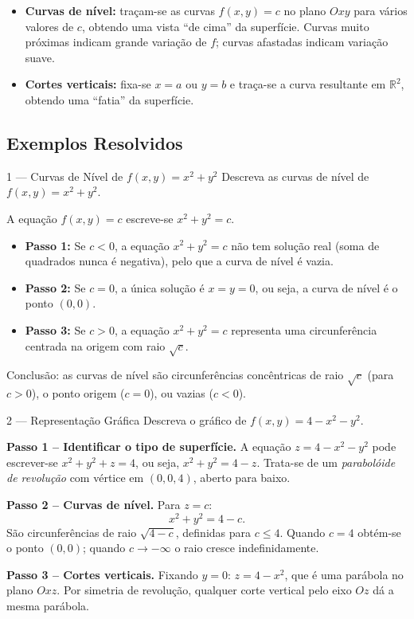\begin{itemize}
  \item \textbf{Curvas de nível:} traçam-se as curvas $f(x,y)=c$ no plano
        $Oxy$ para vários valores de $c$, obtendo uma vista ``de cima'' da
        superfície. Curvas muito próximas indicam grande variação de $f$;
        curvas afastadas indicam variação suave.
  \item \textbf{Cortes verticais:} fixa-se $x=a$ ou $y=b$ e traça-se a
        curva resultante em $\mathbb{R}^2$, obtendo uma ``fatia'' da superfície.
\end{itemize}

\subsection{Exemplos Resolvidos}

\begin{exbox}{1 --- Curvas de Nível de $f(x,y)=x^2+y^2$}
  Descreva as curvas de nível de $f(x,y)=x^2+y^2$.
\end{exbox}
\begin{solbox}
  A equação $f(x,y)=c$ escreve-se $x^2+y^2=c$.
  \begin{itemize}
    \item \textbf{Passo 1:} Se $c<0$, a equação $x^2+y^2=c$ não tem solução
          real (soma de quadrados nunca é negativa), pelo que a curva de nível
          é vazia.
    \item \textbf{Passo 2:} Se $c=0$, a única solução é $x=y=0$, ou seja,
          a curva de nível é o ponto $(0,0)$.
    \item \textbf{Passo 3:} Se $c>0$, a equação $x^2+y^2=c$ representa
          uma circunferência centrada na origem com raio $\sqrt{c}$.
  \end{itemize}
  Conclusão: as curvas de nível são circunferências concêntricas de raio
  $\sqrt{c}$ (para $c>0$), o ponto origem ($c=0$), ou vazias ($c<0$).
\end{solbox}

\begin{exbox}{2 --- Representação Gráfica}
  Descreva o gráfico de $f(x,y)=4-x^2-y^2$.
\end{exbox}
\begin{solbox}
  \textbf{Passo 1 -- Identificar o tipo de superfície.} A equação
  $z=4-x^2-y^2$ pode escrever-se $x^2+y^2+z=4$, ou seja,
  $x^2+y^2=4-z$. Trata-se de um \emph{parabolóide de revolução} com
  vértice em $(0,0,4)$, aberto para baixo.

  \textbf{Passo 2 -- Curvas de nível.} Para $z=c$:
  \[
    x^2+y^2 = 4-c.
  \]
  São circunferências de raio $\sqrt{4-c}$, definidas para $c\leq 4$.
  Quando $c=4$ obtém-se o ponto $(0,0)$; quando $c\to-\infty$ o raio
  cresce indefinidamente.

  \textbf{Passo 3 -- Cortes verticais.} Fixando $y=0$:
  $z=4-x^2$, que é uma parábola no plano $Oxz$. Por simetria de
  revolução, qualquer corte vertical pelo eixo $Oz$ dá a mesma parábola.
\end{solbox}

